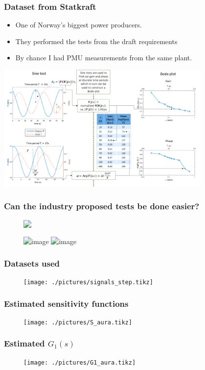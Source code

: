 \begin{frame}
	\frametitle{Dataset from Statkraft}
	\begin{itemize}[<+->]
		\item One of Norway's biggest power producers.
		\item They performed the tests from the draft requirements
		\item By chance I had PMU measurements from the same plant.
		\end{itemize}
		\includegraphics[width=0.8\textwidth]{./pictures/tests.png}
\end{frame}
\begin{frame}
	\frametitle{Can the industry proposed tests be done easier?}
	\begin{figure}
		\includegraphics<1->[width=0.6\textwidth]{./pictures/aura_signals.tikz}
	\end{figure}
	\begin{figure}
		\includegraphics<1>[width=0.6\textwidth]{./pictures/frd.tikz}
		\includegraphics<2>[width=0.6\textwidth]{./pictures/frd_vs_bj.tikz}
	\end{figure}
\end{frame}
\begin{frame}
	\frametitle{Datasets used}
	\begin{figure}
			\texttt{[image: ./pictures/signals\_step.tikz]}
	\end{figure}
\end{frame}
\begin{frame}
	\frametitle{Estimated sensitivity functions}
		\begin{figure}[tb]
			\texttt{[image: ./pictures/S\_aura.tikz]}
		\end{figure}
\end{frame}
\begin{frame}
	\frametitle{Estimated $G_1(s)$}
		\begin{figure}[tb]
			\texttt{[image: ./pictures/G1\_aura.tikz]}
		\end{figure}
\end{frame}
